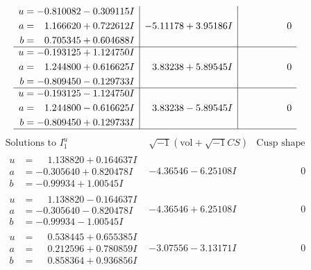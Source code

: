 \documentclass[1p]{elsarticle_modified}
\theoremstyle{definition}
\newcommand{\I}{\sqrt{-1}}
\begin{document}
$$\begin{array}{c|c|c}
\begin{aligned}
u &= -0.810082 - 0.309115 I \\
a &= \phantom{-}1.166620 + 0.722612 I \\
b &= \phantom{-}0.705345 + 0.604688 I\end{aligned}
 & -5.11178 + 3.95186 I & \phantom{-0.000000 } 0 \\ \hline\begin{aligned}
u &= -0.193125 + 1.124750 I \\
a &= \phantom{-}1.244800 + 0.616625 I \\
b &= -0.809450 - 0.129733 I\end{aligned}
 & \phantom{-}3.83238 + 5.89545 I & \phantom{-0.000000 } 0 \\ \hline\begin{aligned}
u &= -0.193125 - 1.124750 I \\
a &= \phantom{-}1.244800 - 0.616625 I \\
b &= -0.809450 + 0.129733 I\end{aligned}
 & \phantom{-}3.83238 - 5.89545 I & \phantom{-0.000000 } 0\\
 \hline 
 \end{array}$$\newpage$$\begin{array}{c|c|c}  
\text{Solutions to }I^u_{1}& \I (\text{vol} + \sqrt{-1}CS) & \text{Cusp shape}\\
 \hline 
\begin{aligned}
u &= \phantom{-}1.138820 + 0.164637 I \\
a &= -0.305640 + 0.820478 I \\
b &= -0.99934 + 1.00545 I\end{aligned}
 & -4.36546 - 6.25108 I & \phantom{-0.000000 } 0 \\ \hline\begin{aligned}
u &= \phantom{-}1.138820 - 0.164637 I \\
a &= -0.305640 - 0.820478 I \\
b &= -0.99934 - 1.00545 I\end{aligned}
 & -4.36546 + 6.25108 I & \phantom{-0.000000 } 0 \\ \hline\begin{aligned}
u &= \phantom{-}0.538445 + 0.655385 I \\
a &= \phantom{-}0.212596 + 0.780859 I \\
b &= \phantom{-}0.858364 + 0.936856 I\end{aligned}
 & -3.07556 - 3.13171 I & \phantom{-0.000000 } 0 \\ \hline\begin{aligned}

\end{aligned}
\end{array}$$
\end{document}
